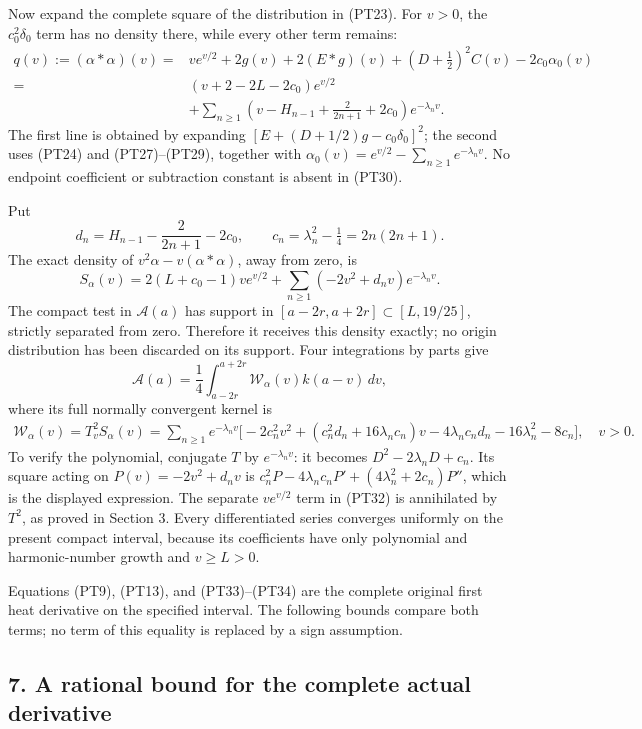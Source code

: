 \documentclass[
  10pt,
  a4paper,
]{article}
\begin{document}
Now expand the complete square of the distribution in (PT23). For
\(v>0\), the \(c_0^2\delta_0\) term has no density there, while every
other term remains: \[
\begin{aligned}
q(v):=(\alpha*\alpha)(v)
={}&ve^{v/2}+2g(v)+2(E*g)(v)
+(D+\tfrac12)^2C(v)-2c_0\alpha_0(v)\\
={}&(v+2-2L-2c_0)e^{v/2}\\
&+\sum_{n\ge1}
\left(v-H_{n-1}+\frac{2}{2n+1}+2c_0\right)e^{-\lambda_nv}.
\end{aligned}
\tag{PT30}
\] The first line is obtained by expanding
\([E+(D+1/2)g-c_0\delta_0]^2\); the second uses (PT24) and
(PT27)--(PT29), together with
\(\alpha_0(v)=e^{v/2}-\sum_{n\ge1}e^{-\lambda_nv}\). No endpoint
coefficient or subtraction constant is absent in (PT30).

Put \[
d_n=H_{n-1}-\frac2{2n+1}-2c_0,\qquad c_n=\lambda_n^2-\tfrac14=2n(2n+1).
\tag{PT31}
\] The exact density of \(v^2\alpha-v(\alpha*\alpha)\), away from zero,
is \[
S_\alpha(v)=2(L+c_0-1)v e^{v/2}
+\sum_{n\ge1}(-2v^2+d_nv)e^{-\lambda_nv}.
\tag{PT32}
\] The compact test in \(\mathcal A(a)\) has support in
\([a-2r,a+2r]\subset[L,19/25]\), strictly separated from zero. Therefore
it receives this density exactly; no origin distribution has been
discarded on its support. Four integrations by parts give \[
\boxed{\mathcal A(a)=\frac14\int_{a-2r}^{a+2r}\mathcal W_\alpha(v)k(a-v)\,dv,}
\tag{PT33}
\] where its full normally convergent kernel is \[
\begin{aligned}
\mathcal W_\alpha(v)=T_v^2S_\alpha(v)
=\sum_{n\ge1}e^{-\lambda_nv}\Big[
-2c_n^2v^2+(c_n^2d_n+16\lambda_nc_n)v
-4\lambda_nc_nd_n-16\lambda_n^2-8c_n\Big],\quad v>0.
\end{aligned}
\tag{PT34}
\] To verify the polynomial, conjugate \(T\) by \(e^{-\lambda_nv}\): it
becomes \(D^2-2\lambda_nD+c_n\). Its square acting on
\(P(v)=-2v^2+d_nv\) is
\(c_n^2P-4\lambda_nc_nP'+(4\lambda_n^2+2c_n)P''\), which is the
displayed expression. The separate \(v e^{v/2}\) term in (PT32) is
annihilated by \(T^2\), as proved in Section 3. Every differentiated
series converges uniformly on the present compact interval, because its
coefficients have only polynomial and harmonic-number growth and
\(v\ge L>0\).

Equations (PT9), (PT13), and (PT33)--(PT34) are the complete original
first heat derivative on the specified interval. The following bounds
compare both terms; no term of this equality is replaced by a sign
assumption.

\subsection{7. A rational bound for the complete actual
derivative}\label{a-rational-bound-for-the-complete-actual-derivative}
\end{document}

